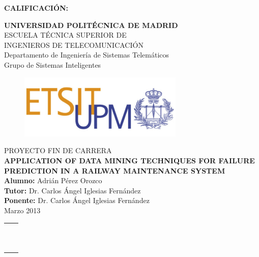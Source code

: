 \documentclass[a4paper,11pt,svgnames]{book}
\begin{document}
{\large{\bf CALIFICACIÓN:}}
\pagestyle{empty}
\cleardoublepage
\vspace*{\baselineskip}
\begin{center}
	{\LARGE\rm\textbf{UNIVERSIDAD POLITÉCNICA DE MADRID}\\
	\vspace{1.0cm}
	 ESCUELA TÉCNICA SUPERIOR DE\\ INGENIEROS DE TELECOMUNICACIÓN
	  }  \\

	 {\Large\rm Departamento de Ingeniería de Sistemas Telemáticos\\
	 Grupo de Sistemas Inteligentes  }  \\

\begin{figure}[!htbp]
	\centering
    \includegraphics[width=0.7\textwidth]{img/logo_etsit.jpg}

\end{figure}
	\vspace{1.0cm}
	{{\LARGE\rm PROYECTO FIN DE CARRERA\\
	\vspace{1.0cm}
	 \textbf{ APPLICATION OF DATA MINING TECHNIQUES FOR FAILURE PREDICTION IN A RAILWAY MAINTENANCE SYSTEM} }}  \\
	 \vspace{1.0cm}
     \Large\rm\textbf{Alumno:} Adrián Pérez Orozco\\
	 \textbf{Tutor:} Dr. Carlos Ángel Iglesias Fernández\\
     \textbf{Ponente:} Dr. Carlos Ángel Iglesias Fernández\\
	 \vspace{1.0cm}
	 Marzo 2013
\end{center}  

\cleardoublepage

\begin{tabular}{p{10cm}p{4cm}}
&\\
&\\
&\\
&\\
&\\
&\\
&\\
&\\
&\\
&\emph{ }\\
&\emph{ }\\
\end{tabular}
\end{document}
